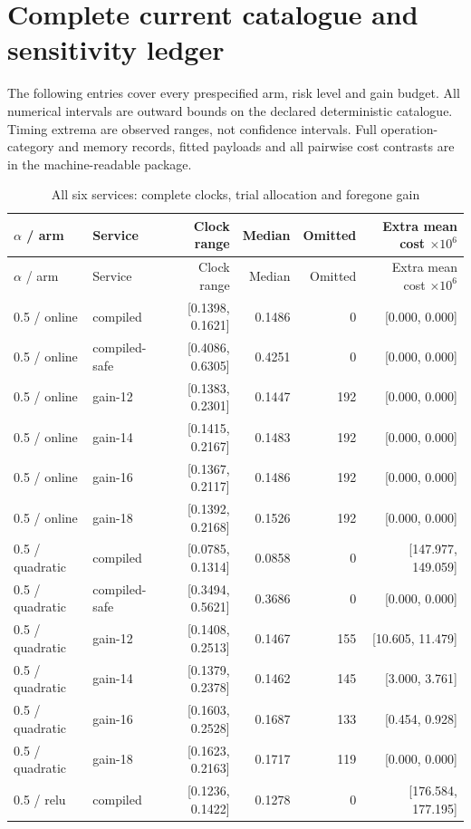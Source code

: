 \section{Complete current catalogue and sensitivity ledger}\label{dev:catalogue110}
The following entries cover every prespecified arm, risk level and gain budget. All numerical intervals are outward bounds on the declared deterministic catalogue. Timing extrema are observed ranges, not confidence intervals. Full operation-category and memory records, fitted payloads and all pairwise cost contrasts are in the machine-readable package.
\begingroup\scriptsize
\begin{longtable}{@{}llrrrr@{}}\caption{All six services: complete clocks, trial allocation and foregone gain}\\
\toprule $\alpha$ / arm & Service & Clock range & Median & Omitted & Extra mean cost $\times10^6$\\\midrule\endfirsthead
\toprule $\alpha$ / arm & Service & Clock range & Median & Omitted & Extra mean cost $\times10^6$\\\midrule\endhead
0.5 / online & compiled & [0.1398, 0.1621] & 0.1486 & 0 & [0.000, 0.000]\\
0.5 / online & compiled-safe & [0.4086, 0.6305] & 0.4251 & 0 & [0.000, 0.000]\\
0.5 / online & gain-12 & [0.1383, 0.2301] & 0.1447 & 192 & [0.000, 0.000]\\
0.5 / online & gain-14 & [0.1415, 0.2167] & 0.1483 & 192 & [0.000, 0.000]\\
0.5 / online & gain-16 & [0.1367, 0.2117] & 0.1486 & 192 & [0.000, 0.000]\\
0.5 / online & gain-18 & [0.1392, 0.2168] & 0.1526 & 192 & [0.000, 0.000]\\
0.5 / quadratic & compiled & [0.0785, 0.1314] & 0.0858 & 0 & [147.977, 149.059]\\
0.5 / quadratic & compiled-safe & [0.3494, 0.5621] & 0.3686 & 0 & [0.000, 0.000]\\
0.5 / quadratic & gain-12 & [0.1408, 0.2513] & 0.1467 & 155 & [10.605, 11.479]\\
0.5 / quadratic & gain-14 & [0.1379, 0.2378] & 0.1462 & 145 & [3.000, 3.761]\\
0.5 / quadratic & gain-16 & [0.1603, 0.2528] & 0.1687 & 133 & [0.454, 0.928]\\
0.5 / quadratic & gain-18 & [0.1623, 0.2163] & 0.1717 & 119 & [0.000, 0.000]\\
0.5 / relu & compiled & [0.1236, 0.1422] & 0.1278 & 0 & [176.584, 177.195]\\

\end{longtable}
